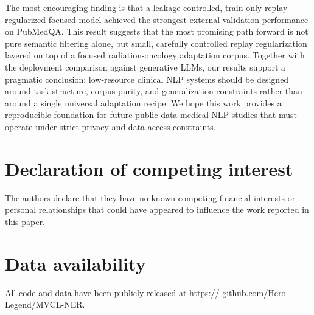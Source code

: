 \documentclass[a4paper,fleqn]{cas-dc}
\begin{document}
The most encouraging finding is that a leakage-controlled, train-only replay-regularized focused model achieved the strongest external validation performance on PubMedQA. This result suggests that the most promising path forward is not pure semantic filtering alone, but small, carefully controlled replay regularization layered on top of a focused radiation-oncology adaptation corpus. Together with the deployment comparison against generative LLMs, our results support a pragmatic conclusion: low-resource clinical NLP systems should be designed around task structure, corpus purity, and generalization constraints rather than around a single universal adaptation recipe. We hope this work provides a reproducible foundation for future public-data medical NLP studies that must operate under strict privacy and data-access constraints.





\printcredits


\section*{Declaration of competing interest}
The authors declare that they have no known competing financial interests or personal relationships that could have appeared to influence the work reported in this paper.

\section*{Data availability}
All code and data have been publicly released at https://
github.com/Hero-Legend/MVCL-NER.





%
%


\end{document}
